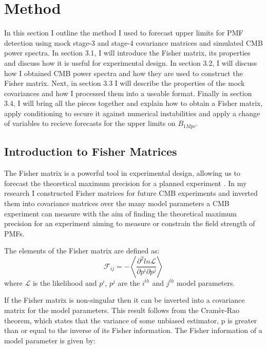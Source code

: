 \section{Method}

In this section I outline the method I used to forecast upper limits for PMF detection using mock stage-3 and stage-4 covariance matrices and simulated CMB power spectra. In section 3.1, I will introduce the Fisher matrix, its properties and discuss how it is useful for experimental design. In section 3.2, I will discuss how I obtained CMB power spectra and how they are used to construct the Fisher matrix. Next, in section 3.3 I will describe the properties of the mock covariances and how I processed them into a useable format. Finally in section 3.4, I will bring all the pieces together and explain how to obtain a Fisher matrix, apply conditioning to secure it against numerical instabilities and apply a change of variables to recieve forecasts for the upper limits on $B_{1Mpc}$.

\subsection{Introduction to Fisher Matrices}

The Fisher matrix is a powerful tool in experimental design, allowing us to forecast the theoretical maximum precision for a planned experiment \cite{Albrecht:2006um}. In my research I constructed Fisher matrices for future CMB experiments and inverted them into covariance matrices over the many model parameters a CMB experiment can measure with the aim of finding the theoretical maximum precision for an experiment aiming to measure or constrain the field strength of PMFs.

The elements of the Fisher matrix are defined as:
\begin{equation}
\label{eqn:likelihoodfisher}
\mathcal{F}_{ij} = - \left \langle \frac{\partial^{2}ln{\mathcal{L}}}{\partial p^i\partial p^j } \right \rangle
\end{equation}
where $\mathcal{L}$ is the likelihood and $p^{i}$, $p^{j}$ are the $i^{th}$ and $j^{th}$ model parameters.
  
If the Fisher matrix is non-singular then it can be inverted into a covariance matrix for the model parameters. This result follows from the Cram\`{e}r-Rao theorem, which states that the variance of some unbiased estimator, p is greater than or equal to the inverse of its Fisher information. The Fisher information of a model parameter is given by:

